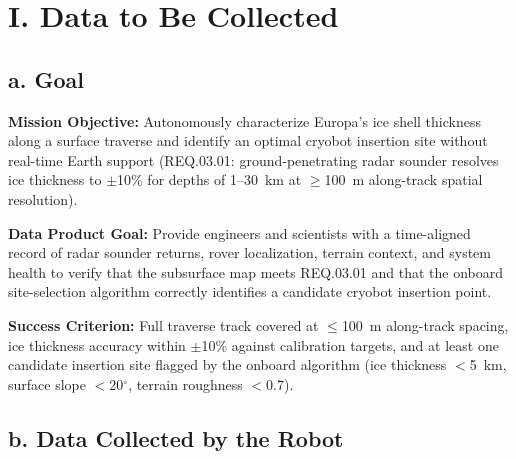 \documentclass[11pt]{article}
\begin{document}
\section*{I. Data to Be Collected}

\subsection*{a. Goal}

\noindent\textbf{Mission Objective:} Autonomously characterize Europa's ice shell thickness
along a surface traverse and identify an optimal cryobot insertion site without real-time
Earth support (REQ.03.01: ground-penetrating radar sounder resolves ice thickness to
$\pm$10\% for depths of 1--30~km at $\geq$100~m along-track spatial resolution).

\noindent\textbf{Data Product Goal:} Provide engineers and scientists with a time-aligned
record of radar sounder returns, rover localization, terrain context, and system health to
verify that the subsurface map meets REQ.03.01 and that the onboard site-selection
algorithm correctly identifies a candidate cryobot insertion point.

\noindent\textbf{Success Criterion:} Full traverse track covered at $\leq$100~m along-track
spacing, ice thickness accuracy within $\pm$10\% against calibration targets, and at least
one candidate insertion site flagged by the onboard algorithm (ice thickness $<$5~km,
surface slope $<$20$^\circ$, terrain roughness $<$0.7).


\subsection*{b. Data Collected by the Robot}
\end{document}
